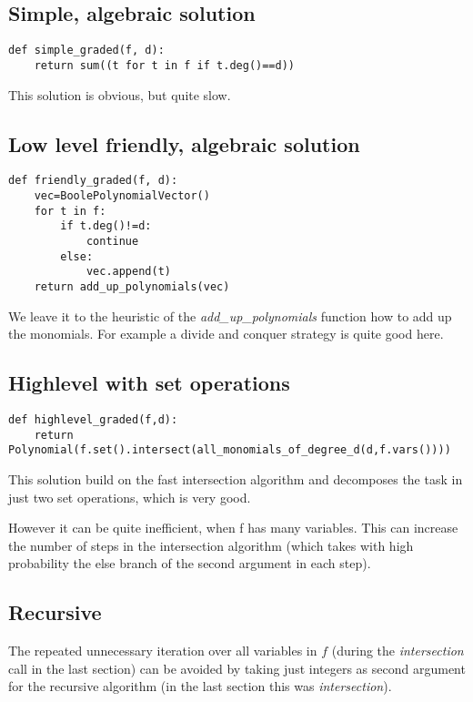 \documentclass[]{article}
\newcommand{\functionname}[1]{\textit{#1}\xspace}
\newcounter{thm}
\begin{document}
\subsection{Simple, algebraic solution}
\begin{verbatim}
def simple_graded(f, d):
    return sum((t for t in f if t.deg()==d))   
\end{verbatim}
This solution is obvious, but quite slow.
\subsection{Low level friendly, algebraic solution}
\begin{verbatim}
def friendly_graded(f, d):
    vec=BoolePolynomialVector()
    for t in f:
        if t.deg()!=d:
            continue
        else:
            vec.append(t)
    return add_up_polynomials(vec)
\end{verbatim}
We leave it to the heuristic of the \functionname{add\_up\_polynomials} function how to add up the monomials. For example a divide and conquer strategy is quite good here.
\subsection{Highlevel with set operations}
\begin{verbatim}
def highlevel_graded(f,d):
    return Polynomial(f.set().intersect(all_monomials_of_degree_d(d,f.vars())))
\end{verbatim}
This solution build on the fast intersection algorithm and decomposes the task in just two set operations, which is very good.

However it can be quite inefficient, when f has many variables.
This can increase the number of steps in the intersection algorithm (which takes with high probability the else branch of the second argument in each step).
\subsection{Recursive}
The repeated unnecessary iteration over all variables in $f$ (during the \functionname{intersection} call in the last section) can be avoided by taking just integers as second argument for the recursive algorithm (in the last section this was \functionname{intersection}).
\end{document}
